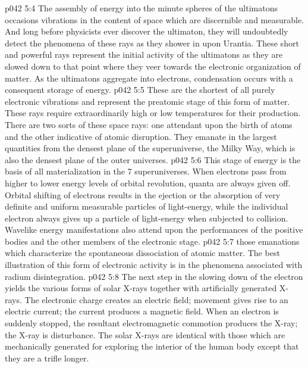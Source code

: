 \vs p042 5:4 \bibnobreakspace {} The assembly of energy into the minute spheres of the ultimatons occasions vibrations in the content of space which are discernible and measurable. And long before physicists ever discover the ultimaton, they will undoubtedly detect the phenomena of these rays as they shower in upon Urantia. These short and powerful rays represent the initial activity of the ultimatons as they are slowed down to that point where they veer towards the electronic organization of matter. As the ultimatons aggregate into electrons, condensation occurs with a consequent storage of energy.
\vs p042 5:5 \bibnobreakspace {} These are the shortest of all purely electronic vibrations and represent the preatomic stage of this form of matter. These rays require extraordinarily high or low temperatures for their production. There are two sorts of these space rays: one attendant upon the birth of atoms and the other indicative of atomic disruption. They emanate in the largest quantities from the densest plane of the superuniverse, the Milky Way, which is also the densest plane of the outer universes.
\vs p042 5:6 \bibnobreakspace {} This stage of energy is the basis of all materialization in the 7 superuniverses. When electrons pass from higher to lower energy levels of orbital revolution, quanta are always given off. Orbital shifting of electrons results in the ejection or the absorption of very definite and uniform measurable particles of light\hyp{}energy, while the individual electron always gives up a particle of light\hyp{}energy when subjected to collision. Wavelike energy manifestations also attend upon the performances of the positive bodies and the other members of the electronic stage.
\vs p042 5:7 \bibnobreakspace {} those emanations which characterize the spontaneous dissociation of atomic matter. The best illustration of this form of electronic activity is in the phenomena associated with radium disintegration.
\vs p042 5:8 \bibnobreakspace {} The next step in the slowing down of the electron yields the various forms of solar X\hyp{}rays together with artificially generated X\hyp{}rays. The electronic charge creates an electric field; movement gives rise to an electric current; the current produces a magnetic field. When an electron is suddenly stopped, the resultant electromagnetic commotion produces the X\hyp{}ray; the X\hyp{}ray is  disturbance. The solar X\hyp{}rays are identical with those which are mechanically generated for exploring the interior of the human body except that they are a trifle longer.
